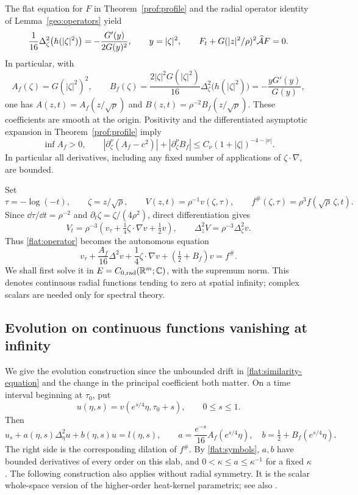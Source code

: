 The flat equation for $F$ in Theorem~\ref{prof:profile} and the
radial operator identity of Lemma~\ref{geo:operators} yield
\begin{equation}\label{flat:profile-identities}
 \frac1{16}\Delta_\zeta^2\bigl(h(|\zeta|^2)\bigr)
 =-\frac{G'(y)}{2G(y)^2},\qquad y=|\zeta|^2,
 \qquad F_t+G(|z|^2/\rho)^2\widehat{\mathcal A}F=0.
\end{equation}
In particular, with
\[
 A_f(\zeta)=G(|\zeta|^2)^2,\qquad
 B_f(\zeta)
 =\frac{2|\zeta|^2G(|\zeta|^2)}{16}
       \Delta_\zeta^2\bigl(h(|\zeta|^2)\bigr)
 =-\frac{yG'(y)}{G(y)},
\]
one has $A(z,t)=A_f(z/\sqrt\rho)$ and
$B(z,t)=\rho^{-2}B_f(z/\sqrt\rho)$.
These coefficients are smooth at the origin. Positivity and the
differentiated asymptotic expansion in Theorem~\ref{prof:profile} imply
\begin{equation}\label{flat:symbols}
 \inf A_f>0,\qquad
 |\partial_\zeta^\nu(A_f-c^2)|+
 |\partial_\zeta^\nu B_f|
 \le C_\nu(1+|\zeta|)^{-4-|\nu|}.
\end{equation}
In particular all derivatives, including any fixed number of
applications of $\zeta\cdot\nabla$, are bounded.

Set
\[
 \tau=-\log(-t),\qquad \zeta=z/\sqrt\rho,
 \qquad V(z,t)=\rho^{-1}v(\zeta,\tau),
 \qquad f^\#(\zeta,\tau)=\rho^3f(\sqrt\rho\,\zeta,t).
\]
Since $\dd\tau/\dd t=\rho^{-2}$ and
$\partial_t\zeta=\zeta/(4\rho^2)$, direct differentiation gives
\[
 V_t=\rho^{-3}
   \left(v_\tau+\tfrac14\zeta\cdot\nabla v+\tfrac12v\right),
 \qquad \Delta_z^2V=\rho^{-3}\Delta_\zeta^2v.
\]
Thus \eqref{flat:operator} becomes the autonomous equation
\begin{equation}\label{flat:similarity-equation}
 v_\tau+\frac{A_f}{16}\Delta^2v
       +\frac14\zeta\cdot\nabla v+(\tfrac12+B_f)v=f^\#.
\end{equation}
We shall first solve it in
$E=C_{0,\mathrm{rad}}(\mathbb{R}^m;\mathbb{C})$, with the supremum norm. This denotes
continuous radial functions tending to zero at spatial infinity;
complex scalars are needed only for spectral theory.

\subsection{Evolution on continuous functions vanishing at infinity}

We give the evolution construction since the unbounded drift in
\eqref{flat:similarity-equation} and the change in the principal
coefficient both matter. On a time interval beginning at $\tau_0$, put
\[
 u(\eta,s)=v(e^{s/4}\eta,\tau_0+s),\qquad 0\le s\le1.
\]
Then
\begin{equation}\label{flat:moving-equation}
 u_s+a(\eta,s)\Delta_\eta^2u+b(\eta,s)u=l(\eta,s),
 \qquad
 a=\frac{e^{-s}}{16}A_f(e^{s/4}\eta),\quad
 b=\tfrac12+B_f(e^{s/4}\eta).
\end{equation}
The right side is the corresponding dilation of $f^\#$.
By \eqref{flat:symbols}, $a,b$ have bounded derivatives of every order
on this slab, and $0<\kappa\le a\le\kappa^{-1}$ for a fixed
$\kappa$. The following construction also applies without radial
symmetry. It is the scalar whole-space version of the higher-order
heat-kernel parametrix; see also \cite[Appendix~A]{HeZeng2021}.

